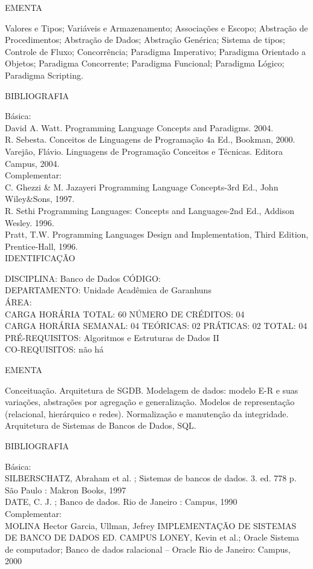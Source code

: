 \documentclass[
	12pt,				%
	openright,			%
  oneside,     %
	a4paper,			%
	chapter=TITLE,		%
	english,			%
	french,				%
	spanish,			%
	brazil				%
	]{abntex2}
\begin{document}
\begin{apendicesenv}
EMENTA 

Valores e Tipos; Variáveis e Armazenamento; Associações e Escopo;
Abstração de Procedimentos; Abstração de Dados; Abstração Genérica;
Sistema de tipos; Controle de Fluxo; Concorrência; Paradigma
Imperativo; Paradigma Orientado a Objetos; Paradigma Concorrente;
Paradigma Funcional; Paradigma Lógico; Paradigma Scripting.

BIBLIOGRAFIA 

Básica:\\
David A. Watt. Programming Language Concepts and Paradigms. 2004.\\
R. Sebesta. Conceitos de Linguagens de Programação  4a Ed., Bookman,
2000.\\
Varejão, Flávio. Linguagens de Programação  Conceitos e Técnicas.
Editora Campus, 2004.\\
Complementar:\\
C. Ghezzi \& M. Jazayeri Programming Language Concepts-3rd Ed., John
Wiley\&Sons, 1997.\\
R. Sethi Programming Languages: Concepts and Languages-2nd Ed., Addison
Wesley. 1996.\\
Pratt, T.W. Programming Languages  Design and Implementation, Third
Edition, Prentice-Hall, 1996.\\


\newpage IDENTIFICAÇÃO

DISCIPLINA: Banco de Dados CÓDIGO:\\ 
DEPARTAMENTO: Unidade Acadêmica de Garanhuns\\
ÁREA: \\
CARGA HORÁRIA TOTAL: 60 NÚMERO DE CRÉDITOS: 04\\
CARGA HORÁRIA SEMANAL: 04 TEÓRICAS: 02 PRÁTICAS: 02 TOTAL: 04\\
PRÉ-REQUISITOS: Algoritmos e Estruturas de Dados II\\
CO-REQUISITOS: não há

EMENTA 

Conceituação. Arquitetura de SGDB. Modelagem de dados: modelo E-R e suas
variações, abstrações por agregação e generalização. Modelos de
representação (relacional, hierárquico e redes). Normalização e
manutenção da integridade. Arquitetura de Sistemas de Bancos de Dados,
SQL.

BIBLIOGRAFIA 

Básica: \\
SILBERSCHATZ, Abraham et al. ; Sistemas de bancos de dados. 3. ed. 778
p. São Paulo : Makron Books, 1997\\
DATE, C. J. ; Banco de dados. Rio de Janeiro : Campus, 1990\\
Complementar:\\
MOLINA Hector Garcia, Ullman, Jefrey  IMPLEMENTAÇÃO DE SISTEMAS DE
BANCO DE DADOS  ED. CAMPUS LONEY, Kevin et al.; Oracle  Sistema
de computador; Banco de dados ralacional -- Oracle Rio de Janeiro:
Campus, 2000\\



\end{apendicesenv}
\end{document}
